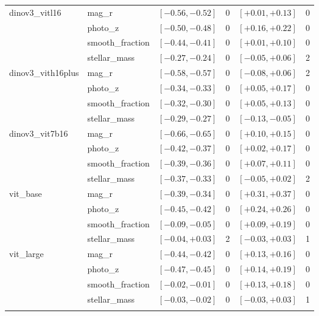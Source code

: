 \begin{tabular}{llcccc}
\addlinespace[2pt]
dinov3\_vitl16 & mag\_r & $[-0.56, -0.52]$ & 0 & $[+0.01, +0.13]$ & 0 \\
 & photo\_z & $[-0.50, -0.48]$ & 0 & $[+0.16, +0.22]$ & 0 \\
 & smooth\_fraction & $[-0.44, -0.41]$ & 0 & $[+0.01, +0.10]$ & 0 \\
 & stellar\_mass & $[-0.27, -0.24]$ & 0 & $[-0.05, +0.06]$ & 2 \\
\addlinespace[2pt]
dinov3\_vith16plus & mag\_r & $[-0.58, -0.57]$ & 0 & $[-0.08, +0.06]$ & 2 \\
 & photo\_z & $[-0.34, -0.33]$ & 0 & $[+0.05, +0.17]$ & 0 \\
 & smooth\_fraction & $[-0.32, -0.30]$ & 0 & $[+0.05, +0.13]$ & 0 \\
 & stellar\_mass & $[-0.29, -0.27]$ & 0 & $[-0.13, -0.05]$ & 0 \\
\addlinespace[2pt]
dinov3\_vit7b16 & mag\_r & $[-0.66, -0.65]$ & 0 & $[+0.10, +0.15]$ & 0 \\
 & photo\_z & $[-0.42, -0.37]$ & 0 & $[+0.02, +0.17]$ & 0 \\
 & smooth\_fraction & $[-0.39, -0.36]$ & 0 & $[+0.07, +0.11]$ & 0 \\
 & stellar\_mass & $[-0.37, -0.33]$ & 0 & $[-0.05, +0.02]$ & 2 \\
\addlinespace[2pt]
vit\_base & mag\_r & $[-0.39, -0.34]$ & 0 & $[+0.31, +0.37]$ & 0 \\
 & photo\_z & $[-0.45, -0.42]$ & 0 & $[+0.24, +0.26]$ & 0 \\
 & smooth\_fraction & $[-0.09, -0.05]$ & 0 & $[+0.09, +0.19]$ & 0 \\
 & stellar\_mass & $[-0.04, +0.03]$ & 2 & $[-0.03, +0.03]$ & 1 \\
\addlinespace[2pt]
vit\_large & mag\_r & $[-0.44, -0.42]$ & 0 & $[+0.13, +0.16]$ & 0 \\
 & photo\_z & $[-0.47, -0.45]$ & 0 & $[+0.14, +0.19]$ & 0 \\
 & smooth\_fraction & $[-0.02, -0.01]$ & 0 & $[+0.13, +0.18]$ & 0 \\
 & stellar\_mass & $[-0.03, -0.02]$ & 0 & $[-0.03, +0.03]$ & 1 \\
\addlinespace[2pt]
\bottomrule
\end{tabular}
